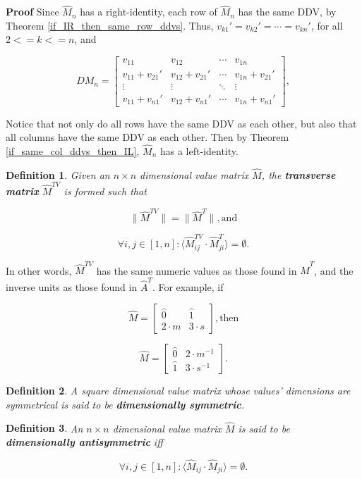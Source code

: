 \documentclass[10pt,letterpaper]{article}
\newtheorem{defn}{Definition}[section]
\newenvironment{proof}{\noindent\textbf{Proof} }{\qed \newline}
\newcommand{\qed}{\nobreak \ifvmode \relax \else
      \ifdim\lastskip<1.5em \hskip-\lastskip
      \hskip1.5em plus0em minus0.5em \fi \nobreak
      \vrule height0.75em width0.5em depth0.25em\fi}
\numberwithin{equation}{section}
\begin{document}
\begin{proof}
Since $\hat M_n$ has a right-identity, each row of $\hat M_n$ has
the same DDV, by Theorem \ref{if_IR_then_same_row_ddvs}.  Thus,
$v_{k1} \prime = v_{k2} \prime = \cdots = v_{kn} \prime$, for all $2 <= k <=
n$, and

\[ DM_n = \left[ \begin{matrix} 
  v_{11} & v_{12} & \cdots & v_{1n} \\
  v_{11} + v_{21} \prime & v_{12} + v_{21} \prime & \cdots & v_{1n} + v_{21} \prime \\
  \vdots & \vdots & \ddots & \vdots \\
  v_{11} + v_{n1} \prime & v_{12} + v_{n1} \prime & \cdots & v_{1n} + v_{n1} \prime
 \end{matrix} \right] , \]

Notice that not only do all rows have the same DDV as each other,
but also that all columns have the same DDV as each other.  Then by Theorem
\ref{if_same_col_ddvs_then_IL}, $\hat M_n$ has a
left-identity.\end{proof}

\begin{defn}Given an $n \times n$ dimensional value matrix $\hat M$, the \textbf{transverse matrix} $\hat M^{TV}$ is formed such that

\[ \| \hat M^{TV} \| = \| \hat M^T \| , \mbox{and} \]

\[ \forall i,j \in [1, n] : \langle \hat M^{TV}_{ij} \cdot \hat M^T_{ji} \rangle = \emptyset . \] \end{defn}

In other words, $\hat M^{TV}$ has the same numeric values as those
found in $\hat M^T$, and the inverse units as those found in $\hat
A^T$.  For example, if

\[ \hat M = \left[ \begin{matrix}
 \hat 0 & \hat 1 \\
 2 \cdot m & 3 \cdot s
 \end{matrix} \right] , \mbox{then} \]

\[ \hat M = \left[ \begin{matrix}
 \hat 0 & 2 \cdot m^{-1} \\
 \hat 1 & 3 \cdot s^{-1}
 \end{matrix} \right] . \]

\begin{defn}A square dimensional value matrix whose values' dimensions are symmetrical is said to be \textbf{dimensionally symmetric}. \end{defn}

\begin{defn}An $n \times n$ dimensional value matrix $\hat M$ is said to be \textbf{dimensionally antisymmetric} iff

\[ \forall i,j \in [1, n] : \langle \hat M_{ij} \cdot \hat M_{ji} \rangle = \emptyset . \] \end{defn}
\end{document}
